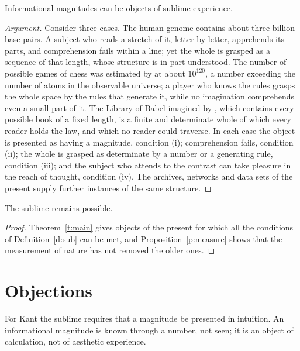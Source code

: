 \documentclass{situationist-preprint}
\begin{document}
\begin{theorem}\label{t:main}
Informational magnitudes can be objects of sublime experience.
\end{theorem}

\begin{proof}[Argument]
Consider three cases. The human genome contains about three billion base pairs. A subject who reads a stretch of it, letter by letter, apprehends its parts, and comprehension fails within a line; yet the whole is grasped as a sequence of that length, whose structure is in part understood. The number of possible games of chess was estimated by \citet{Shannon1950} at about $10^{120}$, a number exceeding the number of atoms in the observable universe; a player who knows the rules grasps the whole space by the rules that generate it, while no imagination comprehends even a small part of it. The Library of Babel imagined by \citet{Borges1941}, which contains every possible book of a fixed length, is a finite and determinate whole of which every reader holds the law, and which no reader could traverse. In each case the object is presented as having a magnitude, condition (i); comprehension fails, condition (ii); the whole is grasped as determinate by a number or a generating rule, condition (iii); and the subject who attends to the contrast can take pleasure in the reach of thought, condition (iv). The archives, networks and data sets of the present supply further instances of the same structure.
\end{proof}

\begin{corollary}\label{c:still}
The sublime remains possible.
\end{corollary}

\begin{proof}
Theorem~\ref{t:main} gives objects of the present for which all the conditions of Definition~\ref{d:sub} can be met, and Proposition~\ref{p:measure} shows that the measurement of nature has not removed the older ones.
\end{proof}

\section{Objections}

\begin{objection}
For Kant the sublime requires that a magnitude be presented in intuition. An informational magnitude is known through a number, not seen; it is an object of calculation, not of aesthetic experience.
\end{objection}
\end{document}
